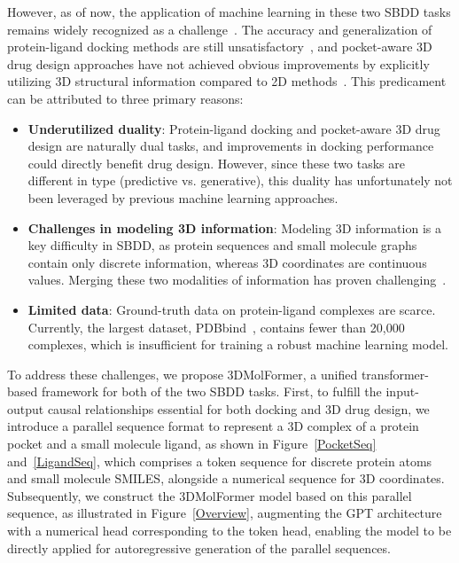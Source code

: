 However, as of now, the application of machine learning in these two SBDD tasks remains widely recognized as a challenge~\citep{SBDDChallenge}. The accuracy and generalization of protein-ligand docking methods are still unsatisfactory~\citep{DockingChallenge}, and pocket-aware 3D drug design approaches have not achieved obvious improvements by explicitly utilizing 3D structural information compared to 2D methods~\citep{DrugDesignChallenge}. This predicament can be attributed to three primary reasons:
\begin{itemize}[leftmargin=*]
    \item \textbf{Underutilized duality}: Protein-ligand docking and pocket-aware 3D drug design are naturally dual tasks, and improvements in docking performance could directly benefit drug design. However, since these two tasks are different in type (predictive vs. generative), this duality has unfortunately not been leveraged by previous machine learning approaches.
    \item \textbf{Challenges in modeling 3D information}: Modeling 3D information is a key difficulty in SBDD, as protein sequences and small molecule graphs contain only discrete information, whereas 3D coordinates are continuous values. Merging these two modalities of information has proven challenging~\citep{2D+3D}. 
    \item \textbf{Limited data}: Ground-truth data on protein-ligand complexes are scarce. Currently, the largest dataset, PDBbind~\citep{PDBbind}, contains fewer than 20,000 complexes, which is insufficient for training a robust machine learning model.
\end{itemize}

To address these challenges, we propose 3DMolFormer, a unified transformer-based framework for both of the two SBDD tasks. 
First, to fulfill the input-output causal relationships essential for both docking and 3D drug design, we introduce a parallel sequence format to represent a 3D complex of a protein pocket and a small molecule ligand, as shown in Figure~\ref{PocketSeq} and~\ref{LigandSeq}, which comprises a token sequence for discrete protein atoms and small molecule SMILES, alongside a numerical sequence for 3D coordinates.
Subsequently, we construct the 3DMolFormer model based on this parallel sequence, as illustrated in Figure~\ref{Overview}, augmenting the GPT architecture~\citep{GPT-2} with a numerical head corresponding to the token head, enabling the model to be directly applied for autoregressive generation of the parallel sequences.

